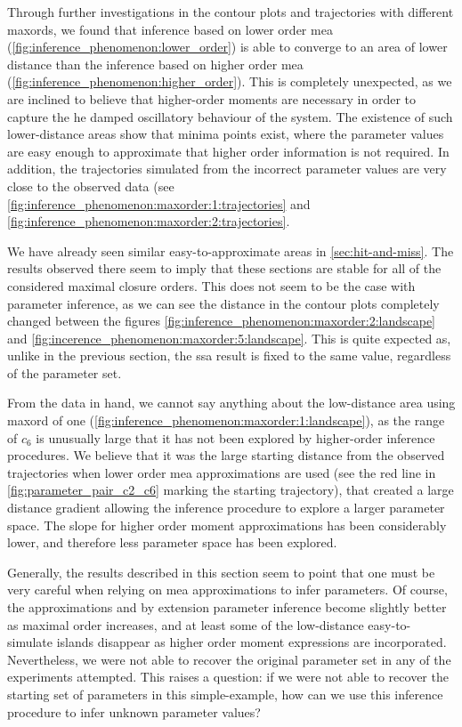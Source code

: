 Through further investigations in the contour plots and trajectories with different \glspl{maxord}, 
we found that inference based on lower order 
\acrlong{mea} (\autoref{fig:inference_phenomenon:lower_order})  is able to converge to an area of lower distance than the inference based on higher order \gls{mea}
(\autoref{fig:inference_phenomenon:higher_order}). This is completely unexpected, as we are inclined to believe that higher-order moments are necessary in order to capture the he damped oscillatory behaviour of the system. 
The existence of such lower-distance areas show that minima points exist, where the parameter values are easy enough to approximate that higher order information is not required. In addition, the trajectories simulated from the incorrect parameter values are very close to the observed data (see \autoref{fig:inference_phenomenon:maxorder:1:trajectories} and \autoref{fig:inference_phenomenon:maxorder:2:trajectories}.

We have already seen similar easy-to-approximate areas in \autoref{sec:hit-and-miss}. 
The results observed there seem to imply that these sections are stable for all of the considered maximal closure orders. 
This does not seem to be the case with parameter inference, as we can see the distance in the contour plots completely changed between the figures \autoref{fig:inference_phenomenon:maxorder:2:landscape} and \autoref{fig:incerence_phenomenon:maxorder:5:landscape}.
This is quite expected as, unlike in the previous section, the \gls{ssa} result is fixed to the same value, regardless of the parameter set.

From the data in hand, we cannot say anything about the low-distance area using \gls{maxord} of one 
(\autoref{fig:inference_phenomenon:maxorder:1:landscape}), 
as the range of $c_6$ is unusually large that it has not been explored by higher-order inference procedures. We believe that it was the large starting distance from the observed trajectories when lower order \gls{mea} approximations are used  (see the red line in \autoref{fig:parameter_pair_c2_c6} marking the starting trajectory), that created a large distance gradient allowing the inference procedure to explore a larger parameter space. The slope for higher order moment approximations has been considerably lower, and therefore less parameter space has been explored.

Generally, the results described in this section seem to point that one must be very careful when relying on \gls{mea} approximations to infer parameters. Of course, the approximations and by extension parameter inference become slightly better as maximal order increases, and at least some of the low-distance easy-to-simulate islands disappear as higher order moment expressions are incorporated. Nevertheless, we were not able to recover the original parameter set in any of the experiments attempted. This raises a question: if we were not able to recover the starting set of parameters in this simple-example, how can we use this inference procedure to infer unknown parameter values? 

